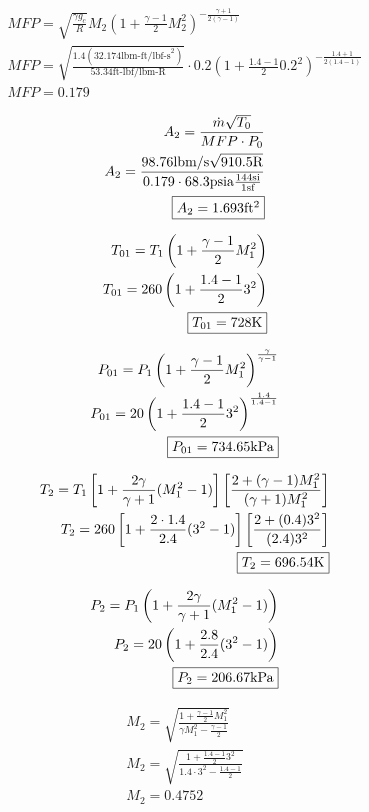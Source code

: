 \begin{align*}
    MFP=\sqrt{\frac{\gamma g_c}{R}}M_2\left(1+\frac{\gamma-1}{2}M_2^2\right)^
    {-\frac{\gamma+1}{2(\gamma-1)}} \\
    MFP=\sqrt{\frac{1.4(32.174\text{lbm-ft/lbf-s}^2)}{53.34\text{ft-lbf/lbm-R}}}\cdot 0.2\left(
    1+\frac{1.4-1}{2}0.2^2\right)^{-\frac{1.4+1}{2(1.4-1)}} \\
    MFP=0.179
\end{align*}

\begin{align*}
    A_2=\frac{\dot{m}\sqrt{T_0}}{MFP\cdot P_0} \\
    A_2=\frac{98.76\text{lbm/s}\sqrt{910.5\text{R}}}{0.179\cdot 68.3\text{psia}
    \frac{144\text{si}}{1\text{sf}}} \\
    \fbox{$A_2=1.693$ft$^2$}
\end{align*}


\begin{align*}
    T_{01}=T_1\left(1+\frac{\gamma-1}{2}M_1^2\right) \\
    T_{01}=260\left(1+\frac{1.4-1}{2}3^2\right) \\
    \fbox{$T_{01}=728$K}
\end{align*}

\begin{align*}
    P_{01}=P_1\left(1+\frac{\gamma-1}{2}M_1^2\right)^\frac{\gamma}{\gamma-1} \\
    P_{01}=20\left(1+\frac{1.4-1}{2}3^2\right)^\frac{1.4}{1.4-1} \\
    \fbox{$P_{01}=734.65$kPa}
\end{align*}

\begin{align*}
    T_2=T_1\left[1+\frac{2\gamma}{\gamma+1}(M_1^2-1)\right]\left[\frac{2+(\gamma-1)
    M_1^2}{(\gamma+1)M_1^2}\right] \\
    T_2=260\left[1+\frac{2\cdot 1.4}{2.4}(3^2-1)\right]\left[\frac{2+(0.4)3^2}
    {(2.4)3^2}\right] \\
    \fbox{$T_2=696.54$K}
\end{align*}

\begin{align*}
    P_2=P_1\left(1+\frac{2\gamma}{\gamma+1}(M_1^2-1)\right) \\
    P_2=20\left(1+\frac{2.8}{2.4}(3^2-1)\right) \\
    \fbox{$P_2=206.67$kPa}
\end{align*}

\begin{align*}
    M_2=\sqrt{\frac{1+\frac{\gamma-1}{2}M_1^2}{\gamma M_1^2-\frac{\gamma-1}{2}}} \\
    M_2=\sqrt{\frac{1+\frac{1.4-1}{2}3^2}{1.4\cdot 3^2-\frac{1.4-1}{2}}} \\
    M_2=0.4752
\end{align*}

